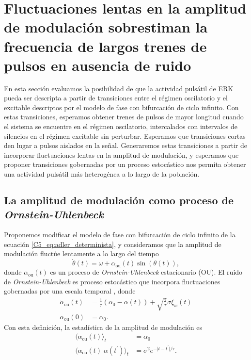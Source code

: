 \documentclass[./main.tex]{subfiles}
\begin{document}
\section{Fluctuaciones lentas en la amplitud de modulación sobrestiman la frecuencia de largos trenes de pulsos en ausencia de ruido}
\label{C7_sec:OU}

En esta sección evaluamos la posibilidad de que la actividad pulsátil de ERK pueda ser descripta a partir de transiciones entre el régimen oscilatorio y el excitable descriptos por el modelo de fase con bifurcación de ciclo infinito. Con estas transiciones, esperamos obtener trenes de pulsos de mayor longitud cuando el sistema se encuentre en el régimen oscilatorio, intercalados con intervalos de silencios en el régimen excitable sin perturbar. Esperamos que transiciones cortas den lugar a pulsos aislados en la señal. Generaremos estas transiciones a partir de incorporar fluctuaciones lentas en la amplitud de modulación, y esperamos que proponer transiciones gobernadas por un proceso estocástico nos permita obtener una actividad pulsátil más heterogénea a lo largo de la población. 


\subsection{La amplitud de modulación como proceso de \textit{Ornstein-Uhlenbeck}}

Proponemos modificar el modelo de fase con bifurcación de ciclo infinito de la ecuación \ref{C5_eq:adler_determinista}, y consideramos que la amplitud de modulación fluctúe lentamente a lo largo del tiempo
\begin{equation}
    \dot{\theta}(t) = \omega + \alpha_{\text{ou}}(t) \sin{(\theta(t))},
    \label{C7_eq:alpha_ou}
\end{equation}
donde $\alpha_{\text{ou}}(t)$ es un proceso de \textit{Ornstein-Uhlenbeck} estacionario (OU). El ruido de \textit{Ornstein-Uhlenbeck} es proceso estocástico que incorpora fluctuaciones gobernadas por una escala temporal \cite{SanMiguel2000}, donde 
\begin{align}
    \dot\alpha_{\text{ou}}(t) &= \frac{1}{\tau} (\alpha_0 - \alpha(t)) + \sqrt{\frac{2}{\tau}}\sigma \xi_w(t) \label{C7_eq:OU_langevin}\\
    \alpha_{\text{ou}}(0) &= \alpha_0.
\end{align}
Con esta definición, la estadística de la amplitud de modulación es
\begin{align}
    \langle \alpha_{\text{ou}}(t) \rangle_t &= \alpha_0 \label{C7_eq:OU_mean}\\
    \langle \alpha_{\text{ou}}(t) \; \alpha(t^\prime) \rangle_t &= \sigma^2 e^{- \lvert t-t^\prime \rvert / \tau } \label{C7_eq:OU_corr}.
\end{align}
\end{document}
